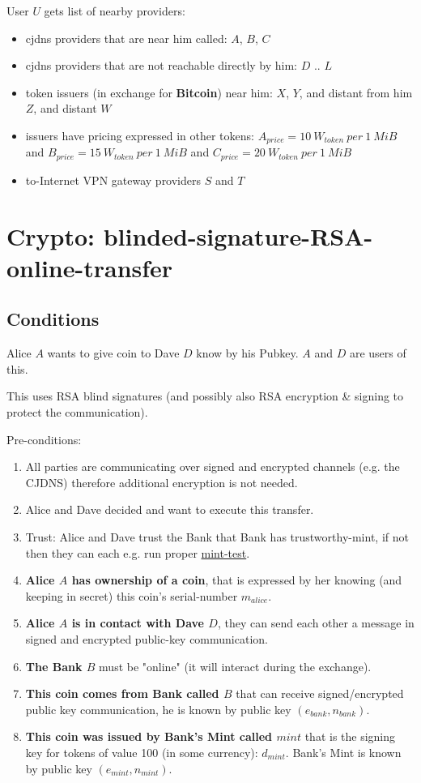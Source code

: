 \documentclass[a4paper,11pt]{article}
\begin{document}
User $U$ gets list of nearby providers: 
\begin{itemize}
  \item cjdns providers that are near him called: $A$, $B$, $C$
  \item cjdns providers that are not reachable directly by him: $D$ .. $L$
  \item token issuers (in exchange for \textbf{Bitcoin}) near him: $X$, $Y$, and distant from him $Z$, and distant $W$
  \item issuers have pricing expressed in other tokens:
  $A_{price}=10\ W_{token}\ per\ 1\ MiB$ and 
  $B_{price}=15\ W_{token}\ per\ 1\ MiB$ and 
  $C_{price}=20\ W_{token}\ per\ 1\ MiB$
  \item to-Internet VPN gateway providers $S$ and $T$
\end{itemize}


\section{Crypto: blinded-signature-RSA-online-transfer}

\subsection{Conditions}

Alice $A$ wants to give coin to Dave $D$ know by his Pubkey. $A$ and $D$ are users of this.

This uses RSA blind signatures (and possibly also RSA encryption \& signing to protect the communication).

Pre-conditions: 
\begin{enumerate}
  \item All parties are communicating over signed and encrypted channels (e.g. the CJDNS) therefore additional encryption is not needed.
  \item Alice and Dave decided and want to execute this transfer.
  \item Trust: Alice and Dave trust the Bank that Bank has trustworthy-mint, 
if not then they can each e.g. run proper \hyperref[sec:crypto_mint-test]{mint-test}.
  \item \textbf{Alice $A$ has ownership of a coin}, that is expressed by her knowing (and keeping in secret) this coin's serial-number $m_{alice}$.
  \item \textbf{Alice $A$ is in contact with Dave $D$}, they can send each other a message in signed and encrypted public-key communication.
  \item \textbf{The Bank $B$} must be "online" (it will interact during the exchange).
  \item \textbf{This coin comes from Bank called $B$} that can receive signed/encrypted public key communication, he is known by public key $(e_{bank},n_{bank})$.
  \item \textbf{This coin was issued by Bank's Mint called $mint$} that is the signing key for tokens of value 100 (in some currency): $d_{mint}$. 
  Bank's Mint is known by public key $(e_{mint},n_{mint})$.
\end{enumerate}
\end{document}
